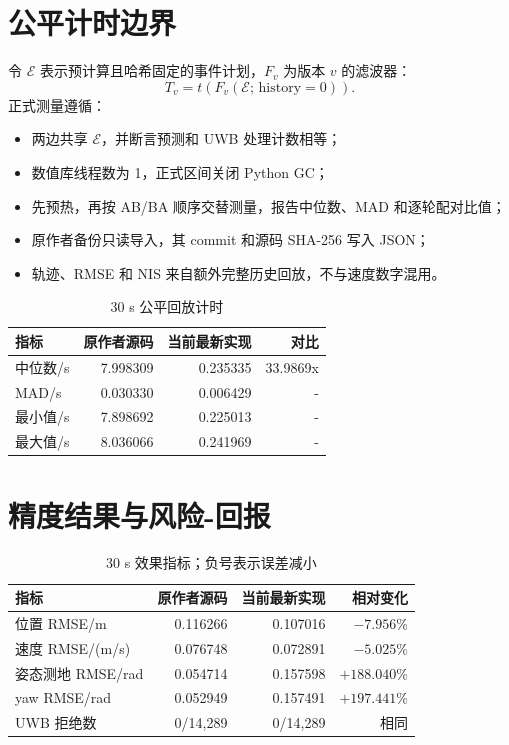 \documentclass[11pt,a4paper]{ctexart}
\begin{document}
\section{公平计时边界}

令 $\mathcal E$ 表示预计算且哈希固定的事件计划，$F_v$ 为版本 $v$ 的滤波器：
\begin{equation}
 T_v=
 t\!\left(F_v(\mathcal E;\,\mathrm{history}=0)\right).
\end{equation}
正式测量遵循：
\begin{itemize}
 \item 两边共享 $\mathcal E$，并断言预测和 UWB 处理计数相等；
 \item 数值库线程数为 1，正式区间关闭 Python GC；
 \item 先预热，再按 AB/BA 顺序交替测量，报告中位数、MAD 和逐轮配对比值；
 \item 原作者备份只读导入，其 commit 和源码 SHA-256 写入 JSON；
 \item 轨迹、RMSE 和 NIS 来自额外完整历史回放，不与速度数字混用。
\end{itemize}

\begin{table}[H]
\centering
\caption{30 s 公平回放计时}
\begin{tabular}{lrrr}
\toprule
指标 & 原作者源码 & 当前最新实现 & 对比\\
\midrule
中位数/s & 7.998309 & 0.235335 & 33.9869x\\
MAD/s & 0.030330 & 0.006429 & -\\
最小值/s & 7.898692 & 0.225013 & -\\
最大值/s & 8.036066 & 0.241969 & -\\
\bottomrule
\end{tabular}
\end{table}

\section{精度结果与风险-回报}

\begin{table}[H]
\centering
\caption{30 s 效果指标；负号表示误差减小}
\begin{tabular}{lrrr}
\toprule
指标 & 原作者源码 & 当前最新实现 & 相对变化\\
\midrule
位置 RMSE/m & 0.116266 & 0.107016 & $-7.956\%$\\
速度 RMSE/(m/s) & 0.076748 & 0.072891 & $-5.025\%$\\
姿态测地 RMSE/rad & 0.054714 & 0.157598 & $+188.040\%$\\
yaw RMSE/rad & 0.052949 & 0.157491 & $+197.441\%$\\
UWB 拒绝数 & 0/14,289 & 0/14,289 & 相同\\
\bottomrule
\end{tabular}
\end{table}
\end{document}
